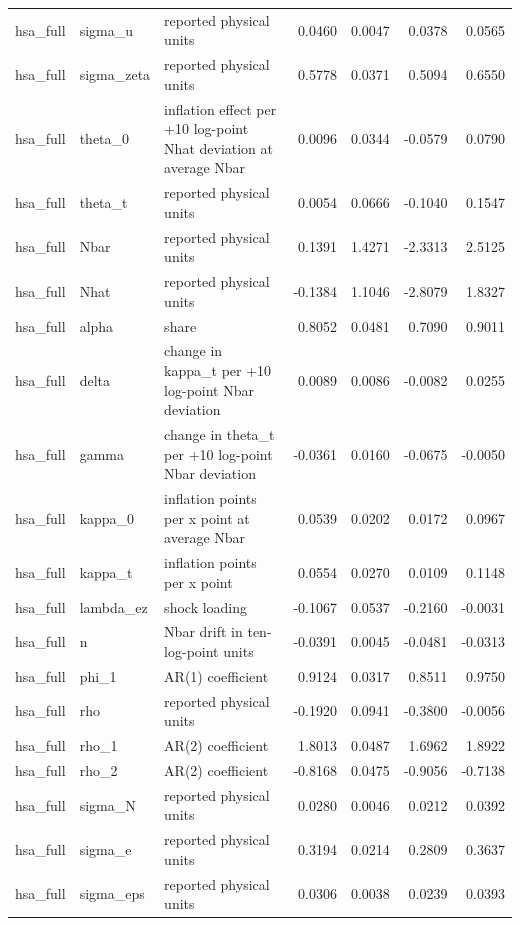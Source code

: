 \begin{tabular}{lllrrrr}
hsa\_full & sigma\_u & reported physical units & 0.0460 & 0.0047 & 0.0378 & 0.0565 \\
hsa\_full & sigma\_zeta & reported physical units & 0.5778 & 0.0371 & 0.5094 & 0.6550 \\
hsa\_full & theta\_0 & inflation effect per +10 log-point Nhat deviation at average Nbar & 0.0096 & 0.0344 & -0.0579 & 0.0790 \\
hsa\_full & theta\_t & reported physical units & 0.0054 & 0.0666 & -0.1040 & 0.1547 \\
hsa\_full & Nbar & reported physical units & 0.1391 & 1.4271 & -2.3313 & 2.5125 \\
hsa\_full & Nhat & reported physical units & -0.1384 & 1.1046 & -2.8079 & 1.8327 \\
hsa\_full & alpha & share & 0.8052 & 0.0481 & 0.7090 & 0.9011 \\
hsa\_full & delta & change in kappa\_t per +10 log-point Nbar deviation & 0.0089 & 0.0086 & -0.0082 & 0.0255 \\
hsa\_full & gamma & change in theta\_t per +10 log-point Nbar deviation & -0.0361 & 0.0160 & -0.0675 & -0.0050 \\
hsa\_full & kappa\_0 & inflation points per x point at average Nbar & 0.0539 & 0.0202 & 0.0172 & 0.0967 \\
hsa\_full & kappa\_t & inflation points per x point & 0.0554 & 0.0270 & 0.0109 & 0.1148 \\
hsa\_full & lambda\_ez & shock loading & -0.1067 & 0.0537 & -0.2160 & -0.0031 \\
hsa\_full & n & Nbar drift in ten-log-point units & -0.0391 & 0.0045 & -0.0481 & -0.0313 \\
hsa\_full & phi\_1 & AR(1) coefficient & 0.9124 & 0.0317 & 0.8511 & 0.9750 \\
hsa\_full & rho & reported physical units & -0.1920 & 0.0941 & -0.3800 & -0.0056 \\
hsa\_full & rho\_1 & AR(2) coefficient & 1.8013 & 0.0487 & 1.6962 & 1.8922 \\
hsa\_full & rho\_2 & AR(2) coefficient & -0.8168 & 0.0475 & -0.9056 & -0.7138 \\
hsa\_full & sigma\_N & reported physical units & 0.0280 & 0.0046 & 0.0212 & 0.0392 \\
hsa\_full & sigma\_e & reported physical units & 0.3194 & 0.0214 & 0.2809 & 0.3637 \\
hsa\_full & sigma\_eps & reported physical units & 0.0306 & 0.0038 & 0.0239 & 0.0393 \\

\end{tabular}
